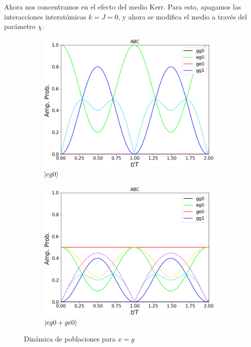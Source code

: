 Ahora nos concentramos en el efecto del medio Kerr. Para esto, apagamos las interacciones interatómicas $k=J=0$, y ahora se modifica el medio a través del parámetro $\chi$. 
\begin{figure}[h]
    \centering
    \begin{subfigure}{0.49\textwidth}
        \includegraphics[width=\textwidth]{figuras/ch4/x eg0 abc.png}
        \caption{$\ket{eg0}$}
        \label{fig4:pob x eg0}
    \end{subfigure}
    \hfill
    \begin{subfigure}{0.49\textwidth}
        \includegraphics[width=\textwidth]{figuras/ch4/x eg0+ abc.png}
        \caption{$\ket{eg0+ge0}$}
        \label{fig4:pob x eg0 sim}
    \end{subfigure}
    \caption{Dinámica de poblaciones para $x=g$}
    \label{fig4:pob x}
\end{figure}

